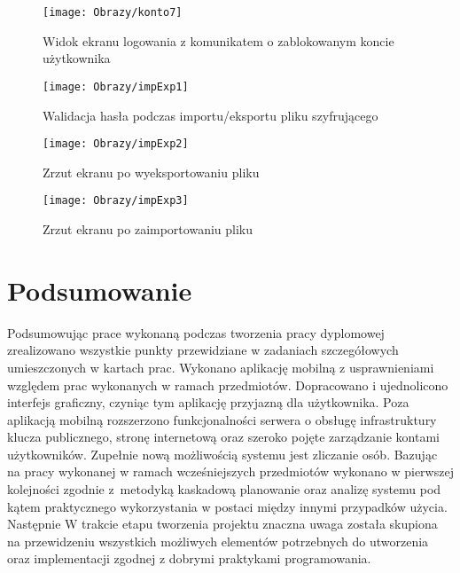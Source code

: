 \documentclass[twoside,10pt]{article}
\begin{document}
\begin{enumerate*}
\begin{figure}[ht!]
\begin{minipage}{0.3\textwidth}
\end{minipage}
\hspace{0.05\textwidth}
\begin{minipage}{0.3\textwidth}
\texttt{[image: Obrazy/konto7]}
\caption{Widok ekranu logowania z komunikatem o zablokowanym koncie użytkownika}
\label{rys:zarzadzanieKontem7}
\end{minipage}
\end{figure}
\newpage
\begin{figure}[ht!]
\centering
\begin{minipage}{0.25\textwidth}
\vspace{0.3cm}
\texttt{[image: Obrazy/impExp1]}
\caption{Walidacja hasła podczas importu/eksportu pliku szyfrującego}
\label{rys:impExp1}
\end{minipage}
\hspace{0.01\textwidth}
\begin{minipage}{0.25\textwidth}
\texttt{[image: Obrazy/impExp2]}
\caption{Zrzut ekranu po wyeksportowaniu pliku }
\label{rys:impExp2}
\end{minipage}
\hspace{0.01\textwidth}
\begin{minipage}{0.25\textwidth}
\texttt{[image: Obrazy/impExp3]}
\caption{Zrzut ekranu po zaimportowaniu pliku }
\label{rys:impExp3}
\end{minipage}
\end{figure}
\end{enumerate*}

\newpage
\section{Podsumowanie} \label{sec:podsumowanie}
Podsumowując prace wykonaną podczas tworzenia pracy dyplomowej zrealizowano wszystkie punkty przewidziane w zadaniach szczegółowych umieszczonych w kartach prac. Wykonano aplikację mobilną z usprawnieniami względem prac wykonanych w ramach przedmiotów. Dopracowano i ujednolicono interfejs graficzny, czyniąc tym aplikację przyjazną dla użytkownika. Poza aplikacją mobilną rozszerzono funkcjonalności serwera o obsługę infrastruktury klucza publicznego, stronę internetową oraz szeroko pojęte zarządzanie kontami użytkowników. Zupełnie nową możliwością systemu jest zliczanie osób. \newline
Bazując na pracy wykonanej w ramach wcześniejszych przedmiotów wykonano w pierwszej kolejności zgodnie z~metodyką kaskadową  planowanie oraz analizę systemu pod kątem praktycznego wykorzystania w postaci między innymi przypadków użycia. Następnie W trakcie etapu tworzenia projektu znaczna uwaga została skupiona na  przewidzeniu wszystkich możliwych  elementów potrzebnych do utworzenia oraz implementacji zgodnej z dobrymi praktykami programowania.
\end{document}
